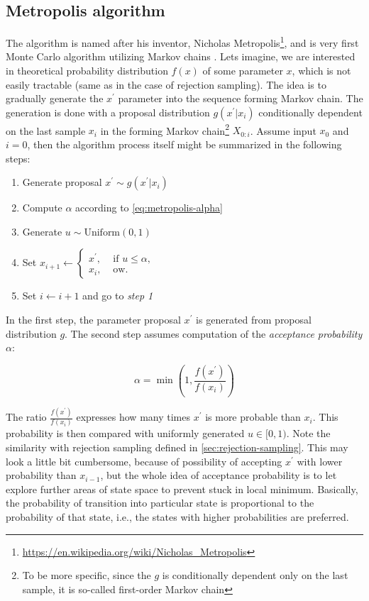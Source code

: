 \documentclass[
  digital, %
  oneside, %
  lof,     %
  lot,     %
]{fithesis4}
\begin{document}
\subsection{Metropolis algorithm}

The algorithm is named after his inventor, 
Nicholas Metropolis\footnote{\url{https://en.wikipedia.org/wiki/Nicholas_Metropolis}}, and is very first Monte 
Carlo algorithm utilizing Markov chains 
\cite{metropolis1953}.
Lets imagine, we are interested in theoretical 
probability distribution $f(x)$ of 
some parameter $x$, which is not easily tractable 
(same as in the case of rejection sampling).
The idea is to gradually generate the 
$x^\prime$ parameter into the sequence 
forming Markov chain.
The generation is done with a proposal distribution 
$g(x^\prime | x_{i})$ conditionally dependent on the last sample
$x_{i}$ in the forming Markov chain\footnote{To be more specific, since the $g$ is conditionally dependent only on the last sample, it is so-called first-order Markov chain} $X_{0:i}$.
Assume input $x_0$ and $i = 0$, then the algorithm process itself 
might be summarized in the following steps:

\begin{enumerate}
  \item Generate proposal $x^\prime \sim g(x^\prime | x_{i})$
  \item Compute $\alpha$ according to \eqref{eq:metropolis-alpha}
  \item Generate $u \sim \text{Uniform}(0, 1)$
  \item Set $x_{i+1} \leftarrow \begin{cases}
    x^\prime, & \text{ if } u \leq \alpha,\\
    x_{i}, & \text{ ow.}
    \end{cases}
    $
  \item Set $i \leftarrow i + 1$ and go to \textit{step 1}
\end{enumerate}

In the first step, the parameter proposal $x^\prime$ is generated from proposal distribution $g$.
The second step assumes computation of the \textit{acceptance probability} $\alpha$:

\begin{equation}\label{eq:metropolis-alpha}
  \alpha = \min \left(1, \frac{f(x^\prime)}{f(x_{i})}\right)
\end{equation}

The ratio $\frac{f(x^\prime)}{f(x_{i})}$ expresses 
how many times $x^\prime$ is more probable than $x_{i}$.
This probability is then compared with uniformly generated $u \in [0, 1)$. 
Note the similarity with rejection sampling defined in 
\autoref{sec:rejection-sampling}.
This may look a little bit cumbersome, 
because of possibility of accepting $x^\prime$ with 
lower probability than $x_{i-1}$, but the 
whole idea of acceptance probability is to let 
explore further areas of state space to prevent 
stuck in local minimum. Basically, the 
probability of transition into particular state is
proportional to the probability of that state, i.e.,
the states with higher probabilities are preferred.
\end{document}
